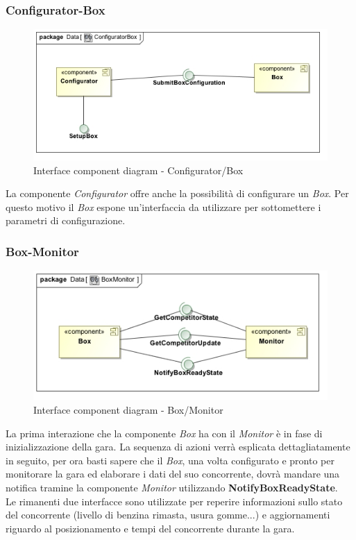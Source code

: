 \subsubsection{Configurator-Box}
\begin{center}
\begin{figure}[h!]
	\includegraphics[scale=0.55]{img/InteractionDiagram/Implementation_Diagram__ConfiguratorBox.jpg}
\caption{Interface component diagram - Configurator/Box}
\end{figure}
\end{center}
La componente \emph{Configurator} offre anche la possibilit\`{a} di configurare un \emph{Box}. Per questo motivo il \emph{Box} espone un'interfaccia
da utilizzare per sottomettere i parametri di configurazione. 
\subsubsection{Box-Monitor}
\begin{center}
\begin{figure}[h!]
	\includegraphics[scale=0.55]{img/InteractionDiagram/Implementation_Diagram__BoxMonitor.jpg}
\caption{Interface component diagram - Box/Monitor}
\end{figure}
\end{center}
La prima interazione che la componente \emph{Box} ha con il \emph{Monitor} \`{e} in fase di inizializzazione della gara. La sequenza di azioni verr\`{a} esplicata
dettagliatamente in seguito, per ora basti sapere che il \emph{Box}, una volta configurato e pronto per monitorare la gara ed elaborare i dati del suo
concorrente, dovr\`{a} mandare una notifica tramine la componente \emph{Monitor} utilizzando \textbf{NotifyBoxReadyState}.\\
Le rimanenti due interfacce sono utilizzate per reperire informazioni sullo stato del concorrente (livello di benzina rimasta, usura gomme...) e
aggiornamenti riguardo al posizionamento e tempi del concorrente durante la gara.
